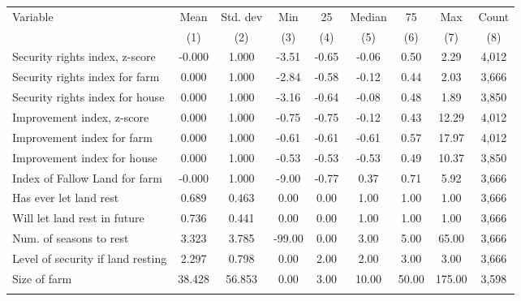 \begin{tabular}{lcccccccc}
\hline \noalign{\smallskip}Variable & Mean & Std. dev & Min & 25 & Median & 75 & Max & Count\\
 & (1) & (2) & (3) & (4) & (5) & (6) & (7) & (8)\\
\noalign{\smallskip}\hline \noalign{\smallskip}Security rights index, z-score & -0.000 & 1.000 & -3.51 & -0.65 & -0.06 & 0.50 & 2.29 & 4,012\\
\quad Security rights index for farm & 0.000 & 1.000 & -2.84 & -0.58 & -0.12 & 0.44 & 2.03 & 3,666\\
\quad Security rights index for house & 0.000 & 1.000 & -3.16 & -0.64 & -0.08 & 0.48 & 1.89 & 3,850\\
Improvement index, z-score & 0.000 & 1.000 & -0.75 & -0.75 & -0.12 & 0.43 & 12.29 & 4,012\\
\quad Improvement index for farm & 0.000 & 1.000 & -0.61 & -0.61 & -0.61 & 0.57 & 17.97 & 4,012\\
\quad Improvement index for house & 0.000 & 1.000 & -0.53 & -0.53 & -0.53 & 0.49 & 10.37 & 3,850\\
Index of Fallow Land for farm & -0.000 & 1.000 & -9.00 & -0.77 & 0.37 & 0.71 & 5.92 & 3,666\\
\quad Has ever let land rest & 0.689 & 0.463 & 0.00 & 0.00 & 1.00 & 1.00 & 1.00 & 3,666\\
\quad Will let land rest in future & 0.736 & 0.441 & 0.00 & 0.00 & 1.00 & 1.00 & 1.00 & 3,666\\
\quad Num. of seasons to rest & 3.323 & 3.785 & -99.00 & 0.00 & 3.00 & 5.00 & 65.00 & 3,666\\
\quad Level of security if land resting & 2.297 & 0.798 & 0.00 & 2.00 & 2.00 & 3.00 & 3.00 & 3,666\\
Size of farm & 38.428 & 56.853 & 0.00 & 3.00 & 10.00 & 50.00 & 175.00 & 3,598\\
\noalign{\smallskip}\hline\end{tabular}
